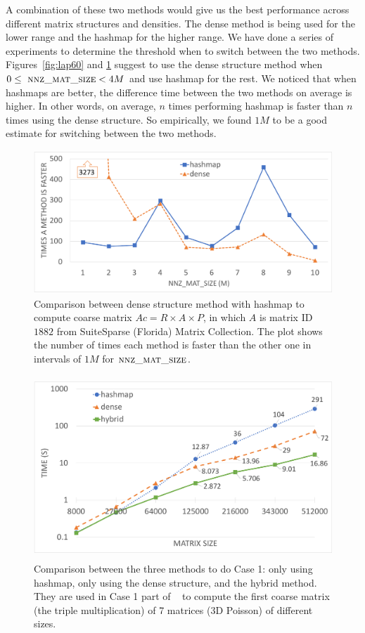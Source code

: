A combination of these two methods would give us the best performance across different matrix structures and densities. The dense method is being used for the lower range and the hashmap for the higher range.
We have done a series of experiments to determine the threshold when to switch between the two methods. Figures~\ref{fig:lap60} and \ref{fig:eco} suggest to use the dense structure method when $0 \le\ \textsc{nnz\_mat\_size} < 4M$ and use hashmap for the rest. We noticed that when hashmaps are better, the difference time between the two methods on average is higher. In other words, on average, $n$ times performing hashmap is faster than $n$ times using the dense structure. So empirically, we found $1M$ to be a good estimate for switching between the two methods.

\begin{figure}[p]
 \centering
 \includegraphics[width=11.8cm,height=5.4cm]{./figures/eco_range.pdf}
 \caption{Comparison between dense structure method with hashmap to compute coarse matrix $Ac = R \times A \times P$, in which $A$ is matrix ID $1882$ from SuiteSparse (Florida) Matrix Collection. The plot shows the number of times each method is faster than the other one in intervals of $1M$ for $\textsc{nnz\_mat\_size}$.}
 \label{fig:eco}
\end{figure}

\begin{figure}[p]
 \centering
 \includegraphics[width=11.8cm,height=6.9cm]{./figures/mix.pdf}
 \caption{Comparison between the three methods to do Case 1: only using hashmap, only using the dense structure, and the hybrid method. They are used in Case 1 part of \recmm~ to compute the first coarse matrix (the triple multiplication) of 7 matrices (3D Poisson) of different sizes.}
 \label{fig:mix}
\end{figure}

